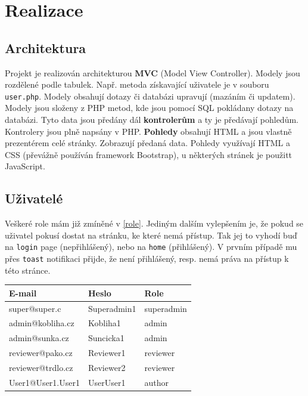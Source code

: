 \documentclass[12pt, a4paper]{article}
\begin{document}
\section{Realizace}
\subsection{Architektura}
Projekt je realizován architekturou \textbf{MVC} (Model View Controller).
Modely jsou rozdělené podle tabulek. Např. metoda získavající uživatele je v souboru \verb|user.php|.
Modely obsahují dotazy či databázi upravují (mazáním či updatem). 
Modely jsou složeny z PHP metod, kde jsou pomocí SQL pokládany dotazy na databázi.
Tyto data jsou předány dál \textbf{kontrolerům} a ty je předávají pohledům. 
Kontrolery jsou plně napsány v PHP.
\textbf{Pohledy} obsahují HTML a jsou vlastně prezentérem celé stránky. Zobrazují předaná data.
Pohledy využívají HTML a CSS (převážně používán framework Bootstrap), u některých stránek je použitt JavaScript.

\newpage
\subsection{Uživatelé}
Veškeré role mám již zmíněné v \ref{role}. 
Jediným dalším vylepšením je, že pokud se uživatel pokusí dostat na stránku, ke které nemá přístup.
Tak jej to vyhodí buď na \verb|login| page (nepřihlášený), nebo na \verb|home| (přihlášený).
V prvním případě mu přes \verb|toast| notifikaci přijde, že není přihlášený, resp. nemá práva na přístup k této stránce.
\vspace{2mm}
\begin{center}
\begin{tabularx}{1\textwidth} { 
  | >{\centering\arraybackslash}X 
  | >{\centering\arraybackslash}X 
  | >{\centering\arraybackslash}X | }
 \hline
 E-mail & Heslo & Role \\
\hline
super@super.c & Superadmin1 & superadmin \\
\hline
admin@kobliha.cz & Kobliha1 & admin \\
\hline
admin@sunka.cz & Suncicka1 & admin \\
\hline
reviewer@pako.cz & Reviewer1 & reviewer \\
\hline
reviewer@trdlo.cz & Reviewer2 & reviewer \\
\hline
User1@User1.User1  & UserUser1  & author  \\
 \hline

\end{tabularx}
\end{center}
\end{document}
